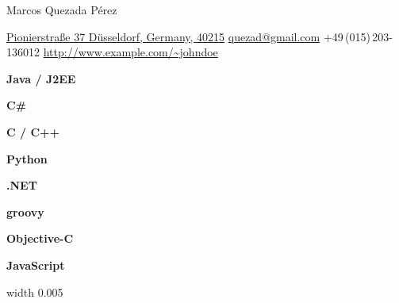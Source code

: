 \documentclass[letterpaper,landscape,MMMyyyy,nonstopmode]{resumecv}
\newcommand{\CVAuthor}{Marcos Quezada Pérez}
\newcommand{\CVWebpage}{http://www.example.com/~johndoe}
\begin{document}

\begin{minipage}{0.24\textwidth}
    \begin{minipage}[t][0.25\textheight][c]{\textwidth\UseTitleFont}
        \CVAuthor
    \end{minipage}
    \begin{minipage}[c][0.20\textheight][c]{\textwidth\UseSubTitleFont}
        \href{https://goo.gl/maps/dR9owVqLbk22}
        {Pionierstraße 37\newline
        Düsseldorf, Germany, 40215}\newline
        \href{mailto:quezad@gmail.com}
        {quezad@gmail.com}\newline
        +49\,(015)\,203-136012\newline
        \href{\CVWebpage}
        {\url{\CVWebpage}}
    \end{minipage}
    \begin{minipage}[t][0.54\textheight][c]{\textwidth\UseNoteFont}
        \begin{skillbox}{0.9}
            \textbf{Java / J2EE}
        \end{skillbox}
        \begin{skillbox}{0.81}
            \textbf{C\#}
        \end{skillbox}
        \begin{skillbox}{0.9}
            \textbf{C / C++}
        \end{skillbox}
        \begin{skillbox}{0.36}
            \textbf{Python}
        \end{skillbox}
        \begin{skillbox}{0.54}
            \textbf{.NET}
        \end{skillbox}
        \begin{skillbox}{0.18}
            \textbf{groovy}
        \end{skillbox}
        \begin{skillbox}{0.27}
            \textbf{Objective-C}
        \end{skillbox}
        \begin{skillbox}{0.9}
            \textbf{JavaScript}
        \end{skillbox}
    \end{minipage}
\end{minipage}\hfill{\color{teal}\vline width 0.005\textwidth}\hfill
\end{document}
